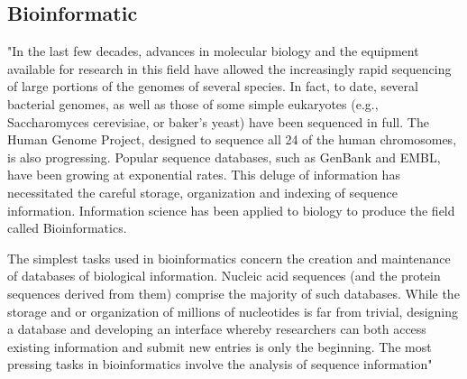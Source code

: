 \subsection{Bioinformatic}
\label{bioinformatic}

"In the last few decades, advances in molecular biology and the equipment available for research in this field have allowed the increasingly rapid sequencing of large portions of the genomes of several species. In fact, to date, several bacterial genomes, as well as those of some simple eukaryotes (e.g., Saccharomyces cerevisiae, or baker's yeast) have been sequenced in full. The Human Genome Project, designed to sequence all 24 of the human chromosomes, is also progressing. Popular sequence databases, such as GenBank and EMBL, have been growing at exponential rates. This deluge of information has necessitated the careful storage, organization and indexing of sequence information. Information science has been applied to biology to produce the field called Bioinformatics.


The simplest tasks used in bioinformatics concern the creation and maintenance of databases of biological information. Nucleic acid sequences (and the protein sequences derived from them) comprise the majority of such databases. While the storage and or organization of millions of nucleotides is far from trivial, designing a database and developing an interface whereby researchers can both access existing information and submit new entries is only the beginning. The most pressing tasks in bioinformatics involve the analysis of sequence information"~\cite{Biology}


